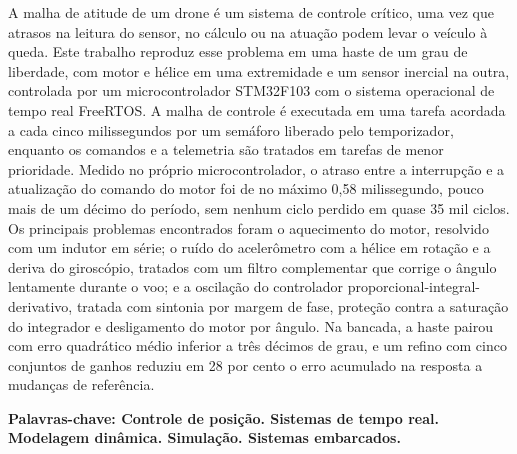 \begin{resumo}[RESUMO]
\begin{SingleSpace}
\noindent A malha de atitude de um drone é um sistema de controle crítico, uma vez que atrasos na leitura do sensor, no cálculo ou na atuação podem levar o veículo à queda. Este trabalho reproduz esse problema em uma haste de um grau de liberdade, com motor e hélice em uma extremidade e um sensor inercial na outra, controlada por um microcontrolador STM32F103 com o sistema operacional de tempo real FreeRTOS. A malha de controle é executada em uma tarefa acordada a cada cinco milissegundos por um semáforo liberado pelo temporizador, enquanto os comandos e a telemetria são tratados em tarefas de menor prioridade. Medido no próprio microcontrolador, o atraso entre a interrupção e a atualização do comando do motor foi de no máximo 0,58 milissegundo, pouco mais de um décimo do período, sem nenhum ciclo perdido em quase 35 mil ciclos. Os principais problemas encontrados foram o aquecimento do motor, resolvido com um indutor em série; o ruído do acelerômetro com a hélice em rotação e a deriva do giroscópio, tratados com um filtro complementar que corrige o ângulo lentamente durante o voo; e a oscilação do controlador proporcional-integral-derivativo, tratada com sintonia por margem de fase, proteção contra a saturação do integrador e desligamento do motor por ângulo. Na bancada, a haste pairou com erro quadrático médio inferior a três décimos de grau, e um refino com cinco conjuntos de ganhos reduziu em 28 por cento o erro acumulado na resposta a mudanças de referência.
\par\vspace{2\baselineskip}
\noindent\textbf{Palavras-chave: Controle de posição. Sistemas de tempo real. Modelagem dinâmica. Simulação. Sistemas embarcados.}
\end{SingleSpace}
\end{resumo}
